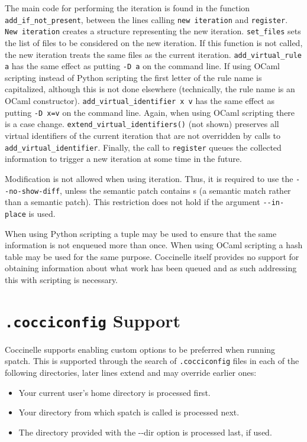 The main code for performing the iteration is found in the function {\tt
  add\_if\_not\_present}, between the lines calling {\tt new iteration} and
{\tt register}.  {\tt New iteration} creates a structure representing the
new iteration.  {\tt set\_files} sets the list of files to be considered on
the new iteration.  If this function is not called, the new iteration
treats the same files as the current iteration.  {\tt add\_virtual\_rule a}
has the same effect as putting {\tt -D a} on the command line.  If
using OCaml scripting instead of Python scripting the first letter of the rule
name is capitalized, although this is not done elsewhere (technically, the
rule name is an OCaml constructor).
{\tt add\_virtual\_identifier x v} has the same effect as putting {\tt -D x=v}
on the command line.  Again, when using OCaml scripting there is a case change.
{\tt extend\_virtual\_identifiers()} (not shown) preserves all virtual
identifiers of the current iteration that are not overridden by calls to
{\tt add\_virtual\_identifier}.  Finally, the call to {\tt register} queues
the collected information to trigger a new iteration at some time in the
future.

Modification is not allowed when using iteration.  Thus, it is required to
use the {\tt -{}-no-show-diff}, unless the semantic patch contains {\tt *}s
(a semantic match rather than a semantic patch).  This restriction does not
hold if the argument {\tt -{}-in-place} is used.

When using Python scripting a tuple may be used
to ensure that the same information is not enqueued more than once.
When using OCaml scripting a hash table may be used for the same purpose.
Coccinelle itself provides no support for obtaining information about what
work has been queued and as such addressing
this with scripting is necessary.

\section{{\tt .cocciconfig} Support}

Coccinelle supports enabling custom options to be preferred when running
spatch.  This is supported through the search of {\tt .cocciconfig} files in each of
the following directories, later lines extend and may override earlier ones:

\begin{itemize}
	\item Your current user's home directory is processed first.
	\item Your directory from which spatch is called is processed next.
	\item The directory provided with the -{}-dir option is processed last, if used.
\end{itemize}

